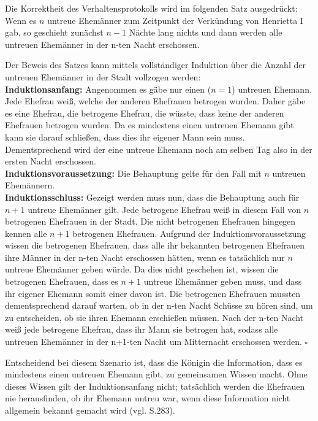 Die Korrektheit des Verhaltensprotokolls wird im folgenden Satz ausgedrückt:\\
Wenn es $n$ untreue Ehemänner zum Zeitpunkt der Verkündung von Henrietta I gab, so geschieht zunächst $n-1$ Nächte lang nichts und dann werden alle untreuen Ehemänner in der n-ten Nacht erschossen.\medskip

Der Beweis des Satzes kann mittels vollständiger Induktion über die Anzahl der untreuen Ehemänner in der Stadt vollzogen werden:\\
\textbf{Induktionsanfang:} Angenommen es gäbe nur einen ($n=1$) untreuen Ehemann. Jede Ehefrau weiß, welche der anderen Ehefrauen betrogen wurden. Daher gäbe es eine Ehefrau, die betrogene Ehefrau, die wüsste, dass keine der anderen Ehefrauen betrogen wurden. Da es mindestens einen untreuen Ehemann gibt kann sie darauf schließen, dass dies ihr eigener Mann sein muss. Dementsprechend wird der eine untreue Ehemann noch am selben Tag also in der ersten Nacht erschossen.\\
\textbf{Induktionsvoraussetzung:} Die Behauptung gelte für den Fall mit $n$ untreuen Ehemännern.\\
\textbf{Induktionsschluss:} Gezeigt werden muss nun, dass die Behauptung auch für $n+1$ untreue Ehemänner gilt.
Jede betrogene Ehefrau weiß in diesem Fall von $n$ betrogenen Ehefrauen in der Stadt. Die nicht betrogenen Ehefrauen hingegen kennen alle $n+1$ betrogenen Ehefrauen.
Aufgrund der Induktionsvoraussetzung wissen die betrogenen Ehefrauen, dass alle ihr bekannten betrogenen Ehefrauen ihre Männer in der n-ten Nacht erschossen hätten, wenn es tatsächlich nur $n$ untreue Ehemänner geben würde.
Da dies nicht geschehen ist, wissen die betrogenen Ehefrauen, dass es $n+1$ untreue Ehemänner geben muss, und dass ihr eigener Ehemann somit einer davon ist.
Die betrogenen Ehefrauen mussten dementsprechend darauf warten, ob in der n-ten Nacht Schüsse zu hören sind, um zu entscheiden, ob sie ihren Ehemann erschießen müssen.
Nach der n-ten Nacht weiß jede betrogene Ehefrau, dass ihr Mann sie betrogen hat, sodass alle untreuen Ehemänner in der n+1-ten Nacht um Mitternacht erschossen werden. $\square$

Entscheidend bei diesem Szenario ist, dass die Königin die Information, dass es mindestens einen untreuen Ehemann gibt, zu gemeinsamen Wissen macht.
Ohne dieses Wissen gilt der Induktionsanfang nicht; tatsächlich werden die Ehefrauen nie herausfinden, ob ihr Ehemann untreu war, wenn diese Information nicht allgemein bekannt gemacht wird (vgl. \cite{kshemkalyani2011distributed} S.283).

